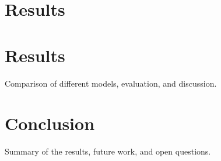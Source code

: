 \documentclass[12pt]{article}
\theoremstyle{plain}
\theoremstyle{definition}
\theoremstyle{remark}
\begin{document}
\section{Results}



\section{Results}
\label{sec:results}

Comparison of different models, evaluation, and discussion.

\section{Conclusion}
\label{sec:concl}

Summary of the results, future work, and open questions.



\newpage
\thispagestyle{empty}

\nocite{*}


\end{document}
